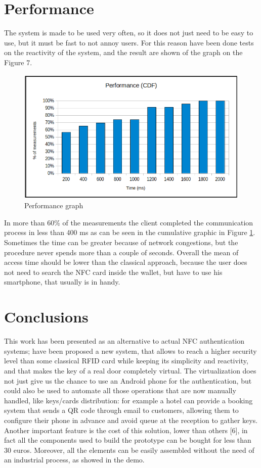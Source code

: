 \documentclass[conference]{IEEEtran}
\begin{document}
\section{Performance}

The system is made to be used very often, so it does not just need to be easy to use, but it must be fast to not annoy users. For this reason have been done tests on the reactivity of the system, and the result are shown of the graph on the Figure 7.

\begin{figure}[h]
\centering
\includegraphics[scale=0.35]{fig7}
\caption{Performance graph}
\label{graph}
\end{figure}

In more than 60\% of the measurements the client completed the communication process in less than 400 ms as can be seen in the cumulative graphic in Figure \ref{graph}.  Sometimes the time can be greater because of network congestions, but the procedure never spends more than a couple of seconds. 
Overall the mean of access time should be lower than the classical approach, because the user does not need to search the NFC card inside the wallet, but have to use his smartphone, that usually is in handy.

\section{Conclusions}

This work has been presented as an alternative to actual NFC authentication systems; have been proposed a new system, that allows to reach a higher security level than some classical RFID card while keeping its simplicity and reactivity, and that makes the key of a real door completely virtual. The virtualization does not just give us the chance to use an Android phone for the authentication, but could also be used to automate all those operations that are now manually handled, like keys/cards distribution: for example a hotel can provide a booking system that sends a QR code through email to customers, allowing them to configure their phone in advance and avoid queue at the reception to gather keys.
Another important feature is the cost of this solution, lower than others [6], in fact all the components used to build the prototype can be bought for less than 30 euros. Moreover, all the elements can be easily assembled without the need of an industrial process, as showed in the demo.
\end{document}
